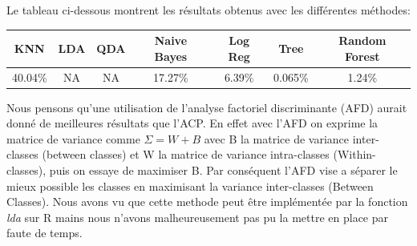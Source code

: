 \documentclass[10pt]{article}
\begin{document}
Le tableau ci-dessous montrent les résultats obtenus avec les différentes méthodes:
\begin{center}
	\begin{tabular}{c |c | c | c| c| c| c|}
		\hline
		KNN & LDA & QDA & Naive Bayes & Log Reg & Tree & Random Forest\\
		\hline	
		40.04\% & NA &  NA &17.27\% & 6.39\% &  0.065\%& 1.24\%
	\end{tabular}
\end{center}

Nous pensons qu'une utilisation de l'analyse factoriel discriminante (AFD) aurait donné de meilleures résultats que l'ACP. En effet avec l'AFD on exprime la matrice de variance comme $\Sigma = W + B$ avec B la matrice de variance inter-classes (between classes) et W la matrice de variance intra-classes (Within-classes), puis on essaye de maximiser B. Par conséquent l'AFD vise a séparer le mieux possible les classes en maximisant la variance inter-classes (Between Classes). Nous avons vu que cette methode peut être implémentée par la fonction \textit{lda} sur R mains nous n'avons malheureusement pas  pu la mettre en place par faute de temps. 
\end{document}
